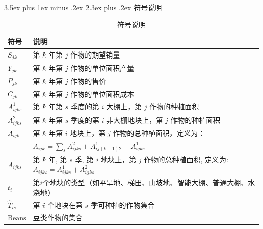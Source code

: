 \documentclass[12pt,a4paper]{nmmcm}
\makeatletter
\renewcommand\section{\@startsection{section}{1}{0pt}%
    {3.5ex plus 1ex minus .2ex}%
    {2.3ex plus .2ex}%
    {\normalfont\LARGE\bfseries}}
\makeatother
\begin{document}
\section{符号说明}
\begin{table}[htbp]
  \centering
  \caption{符号说明}
  \renewcommand{\arraystretch}{1.2}
  \setlength{\tabcolsep}{10pt}
  \begin{tabular}{p{3cm} | p{10cm}}
    \hline
    \hline
    \textbf{符号}       & \textbf{说明}                                                                           \\
    \hline
    $S_{jk}$          & 第 $k$ 年第 $j$ 作物的期望销量                                                                  \\
    $Y_{jk}$          & 第 $k$ 年第 $j$ 作物的单位面积产量                                                                \\
    $P_{jk}$          & 第 $k$ 年第 $j$ 作物的售价                                                                    \\
    $C_{jk}$          & 第 $k$ 年第 $j$ 作物的单位面积成本                                                                \\
    $A^1_{ijks}$      & 第 $k$ 年第 $s$ 季度的第 $i$ 大棚上，第 $j$ 作物的种植面积                                               \\
    $A^2_{ijks}$      & 第 $k$ 年第 $s$ 季度的第 $i$ 非大棚地块上，第 $j$ 作物的种植面积                                            \\
    $A_{ijk}$         & 第 $k$ 年第 $i$ 地块上，第 $j$ 作物的总种植面积，定义为：                                                  \\
                      & $A_{ijk} = \sum_s A^2_{ijks} + A^1_{ij(k-1)2} + A^1_{ijks}$                           \\
    $A_{ijks}$        & 第 $k$ 年, 第 $s$ 季, 第 $i$ 地块上，第 $j$ 作物的总种植面积, 定义为: $A_{ijks} = A^1_{ijks} + A^2_{ijks}$ \\
    $t_i$             & 第$i$个地块的类型（如平旱地、梯田、山坡地、智能大棚、普通大棚、水浇地）                                                 \\
    $\hat{T}_{is}$    & 第 $i$ 个地块在第 $s$ 季可种植的作物集合                                                             \\
    $\text{Beans}$    & 豆类作物的集合                                                                               \\

\end{tabular}
\end{table}
\end{document}
